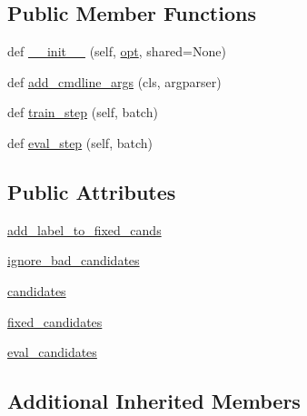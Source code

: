 \subsection*{Public Member Functions}
\begin{DoxyCompactItemize}
\item 
def \hyperlink{classparlai_1_1agents_1_1transformer_1_1biencoder_1_1AddLabelFixedCandsTRA_a591f1ad203927b07db58520a7295132c}{\+\_\+\+\_\+init\+\_\+\+\_\+} (self, \hyperlink{classparlai_1_1core_1_1torch__agent_1_1TorchAgent_a785bb920cf8c8afc3e9bf6a8b77e335a}{opt}, shared=None)
\item 
def \hyperlink{classparlai_1_1agents_1_1transformer_1_1biencoder_1_1AddLabelFixedCandsTRA_aa3b5febae0153e89349becb922758d0c}{add\+\_\+cmdline\+\_\+args} (cls, argparser)
\item 
def \hyperlink{classparlai_1_1agents_1_1transformer_1_1biencoder_1_1AddLabelFixedCandsTRA_ae051c7783bdd5e8b9ddc920059409b5d}{train\+\_\+step} (self, batch)
\item 
def \hyperlink{classparlai_1_1agents_1_1transformer_1_1biencoder_1_1AddLabelFixedCandsTRA_ae05059428f346f00e73289120ffb6c1e}{eval\+\_\+step} (self, batch)
\end{DoxyCompactItemize}
\subsection*{Public Attributes}
\begin{DoxyCompactItemize}
\item 
\hyperlink{classparlai_1_1agents_1_1transformer_1_1biencoder_1_1AddLabelFixedCandsTRA_a40cd2d8f3de8d9a749e0d79d8b1b6cd2}{add\+\_\+label\+\_\+to\+\_\+fixed\+\_\+cands}
\item 
\hyperlink{classparlai_1_1agents_1_1transformer_1_1biencoder_1_1AddLabelFixedCandsTRA_a65c3b776ca3b44522e25996123b9e603}{ignore\+\_\+bad\+\_\+candidates}
\item 
\hyperlink{classparlai_1_1agents_1_1transformer_1_1biencoder_1_1AddLabelFixedCandsTRA_a2a5ee2df4eec5a251ae914e29ec61915}{candidates}
\item 
\hyperlink{classparlai_1_1agents_1_1transformer_1_1biencoder_1_1AddLabelFixedCandsTRA_aac3972508d5b388456ee4945817cd48b}{fixed\+\_\+candidates}
\item 
\hyperlink{classparlai_1_1agents_1_1transformer_1_1biencoder_1_1AddLabelFixedCandsTRA_a099bbf8752cf33e6acbbb4c64edb4903}{eval\+\_\+candidates}
\end{DoxyCompactItemize}
\subsection*{Additional Inherited Members}


